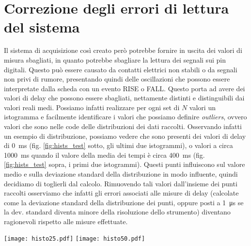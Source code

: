 \documentclass[
    rmp,
    reprint, 
    superscriptaddress, 
    altaffilletter, 
    amsmath, 
    amssymb, 
    a4paper,
    varvw]{revtex4-2}
\begin{document}
\section{Correzione degli errori di lettura del sistema}
Il sistema di acquisizione così creato però potrebbe fornire in uscita dei valori di misura sbagliati, in quanto potrebbe sbagliare la lettura dei segnali sui pin digitali. Questo può essere causato da contatti elettrici non stabili o da segnali non privi di rumore, presentando quindi delle oscillazioni che possono essere interpretate dalla scheda con un evento RISE o FALL. Questo porta ad avere dei valori di delay che possono essere sbagliati, nettamente distinti e distinguibili dai valori reali medi. Possiamo infatti realizzare per ogni set di $N$ valori un istogramma e facilmente identificare i valori che possiamo definire \emph{outliers}, ovvero valori che sono nelle code delle distribuzioni dei dati raccolti. Osservando infatti un esempio di distribuzione, possiamo vedere che sono presenti dei valori di delay di \SI{0}{\milli\second} (fig. \ref{fig:hists_test} sotto, gli ultimi due istogrammi), o valori a circa \SI{1000}{\milli\second} quando il valore della media dei tempi è circa \SI{400}{\milli\second} (fig. \ref{fig:hists_test} sopra, i primi due istogrammi).
Questi punti influiscono sul valore medio e sulla deviazione standard della distribuzione in modo influente, quindi decidiamo di toglierli dal calcolo. Rimuovendo tali valori dall'insieme dei punti raccolti osserviamo che infatti gli errori associati alle misure di delay (calcolate come la deviazione standard della distribuzione dei punti, oppure posti a \SI{1}{\micro\second} se la dev. standard diventa minore della risoluzione dello strumento) diventano ragionevoli rispetto alle misure effettuate. 

\begin{figure*}
    \texttt{[image: histo25.pdf]}
    \texttt{[image: histo50.pdf]}
    \caption{Istogrammi dei set di dati raccolti (sono riportati quelli per le misure a \SI{0.25}{\metre} e quelle per le misure a \SI{0.5}{\metre}). Per ogni distanza sono raccolti $N=50$ punti, sia per l'evento RISE che per l'evento FALL, in due istanti differenti, un per il primo fronte di variazione del segnale fornito dal microfono, uno per il secondo fronte. La media tra queste due misure permette di ottenere poi una misura più precisa dell'effettivo fronte d'onda che viene rilevato dal microfono. }\label{fig:hists_test}
\end{figure*}
\end{document}
